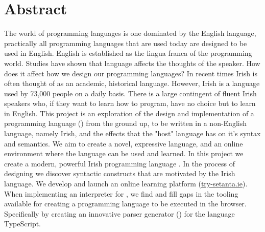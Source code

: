 \chapter{Abstract}
The world of programming languages is one dominated by the English language, practically all programming languages that are used today are designed to be used in English. English is established as the lingua franca of the programming world.
Studies have shown that language affects the thoughts of the speaker\cite{languagecolour}. How does it affect how we design our programming languages?
In recent times Irish is often thought of as an academic, historical language. However, Irish is a language used by 73,000 people on a daily basis. There is a large contingent of fluent Irish speakers who, if they want to learn how to program, have no choice but to learn in English.
This project is an exploration of the design and implementation of a programming language (\Setanta{}) from the ground up, to be written in a non-English language, namely Irish, and the effects that the "host" language has on it's syntax and semantics. We aim to create a novel, expressive language, and an online environment where the language can be used and learned.
In this project we create a modern, powerful Irish programming language \Setanta{}. In the process of designing \Setanta{} we discover syntactic constructs that are motivated by the Irish language. We develop and launch an online learning platform (\href{https://try-setanta.ie}{try-setanta.ie}). When implementing an interpreter for \Setanta{}, we find and fill gaps in the tooling available for creating a programming language to be executed in the browser. Specifically by creating an innovative parser generator (\tsPEG{}) for the language TypeScript.
